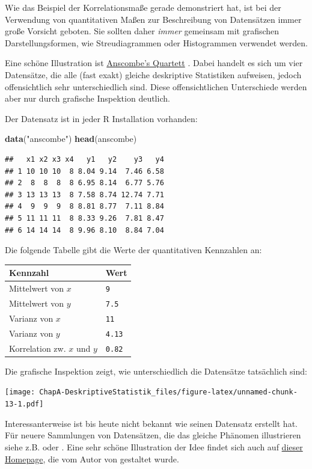 \documentclass[]{book}
\newenvironment{Shaded}{\begin{snugshade}}{\end{snugshade}}
\newcommand{\KeywordTok}[1]{\textcolor[rgb]{0.13,0.29,0.53}{\textbf{#1}}}
\newcommand{\StringTok}[1]{\textcolor[rgb]{0.31,0.60,0.02}{#1}}
\newcommand{\NormalTok}[1]{#1}
\begin{document}
Wie das Beispiel der Korrelationsmaße gerade demonstriert hat, ist bei
der Verwendung von quantitativen Maßen zur Beschreibung von Datensätzen
immer große Vorsicht geboten. Sie sollten daher \emph{immer} gemeinsam
mit grafischen Darstellungsformen, wie Streudiagrammen oder Histogrammen
verwendet werden.

Eine schöne Illustration ist \href{}{Anscombe's Quartett}
\citep{Anscombe}. Dabei handelt es sich um vier Datensätze, die alle
(fast exakt) gleiche deskriptive Statistiken aufweisen, jedoch
offensichtlich sehr unterschiedlich sind. Diese offensichtlichen
Unterschiede werden aber nur durch grafische Inspektion deutlich.

Der Datensatz ist in jeder R Installation vorhanden:

\begin{Shaded}
\begin{Highlighting}[]
\KeywordTok{data}\NormalTok{(}\StringTok{"anscombe"}\NormalTok{)}
\KeywordTok{head}\NormalTok{(anscombe)}
\end{Highlighting}
\end{Shaded}

\begin{verbatim}
##   x1 x2 x3 x4   y1   y2    y3   y4
## 1 10 10 10  8 8.04 9.14  7.46 6.58
## 2  8  8  8  8 6.95 8.14  6.77 5.76
## 3 13 13 13  8 7.58 8.74 12.74 7.71
## 4  9  9  9  8 8.81 8.77  7.11 8.84
## 5 11 11 11  8 8.33 9.26  7.81 8.47
## 6 14 14 14  8 9.96 8.10  8.84 7.04
\end{verbatim}

Die folgende Tabelle gibt die Werte der quantitativen Kennzahlen an:

\begin{longtable}[]{@{}ll@{}}
\toprule
Kennzahl & Wert\tabularnewline
\midrule
\endhead
Mittelwert von \(x\) & \texttt{9}\tabularnewline
Mittelwert von \(y\) & \texttt{7.5}\tabularnewline
Varianz von \(x\) & \texttt{11}\tabularnewline
Varianz von \(y\) & \texttt{4.13}\tabularnewline
Korrelation zw. \(x\) und \(y\) & \texttt{0.82}\tabularnewline
\bottomrule
\end{longtable}

Die grafische Inspektion zeigt, wie unterschiedlich die Datensätze
tatsächlich sind:

\texttt{[image: ChapA-DeskriptiveStatistik\_files/figure-latex/unnamed-chunk-13-1.pdf]}

Interessanterweise ist bis heute nicht bekannt wie \citet{Anscombe}
seinen Datensatz erstellt hat. Für neuere Sammlungen von Datensätzen,
die das gleiche Phänomen illustrieren siehe z.B. \citet{AnscombeNew1}
oder \citet{AnscombeNew2} . Eine sehr schöne Illustration der Idee
findet sich auch auf
\href{https://www.autodeskresearch.com/publications/samestats}{dieser
Homepage}, die vom Autor von \citet{AnscombeNew2} gestaltet wurde.
\end{document}
